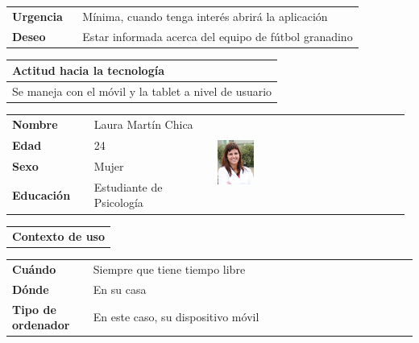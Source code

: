\documentclass[11pt]{article}
\begin{document}
\begin{table}[H]
  \begin{tabular}{p{0.2\linewidth}|p{0.8\linewidth}}
    \toprule
    \textbf{Urgencia} & Mínima, cuando tenga interés abrirá la aplicación\\
    \textbf{Deseo}  & Estar informada acerca del equipo de fútbol granadino \\
    \bottomrule
  \end{tabular}

  \begin{tabular}{p{1.028\linewidth}}
    \textbf{Actitud hacia la tecnología}\\
    \midrule
    Se maneja con el móvil y la tablet a nivel de usuario
  \end{tabular}
\end{table}

\begin{table}[H]
  \centering
  \begin{tabular}{p{0.2\linewidth}|p{0.3\linewidth}p{0.475\linewidth}}
    \toprule
    \textbf{Nombre} & Laura Martín Chica  &\multirow{4}{*}{\begin{minipage}{1.\textwidth}\includegraphics[width=0.2\textwidth, height=30mm]{Ana}\end{minipage}}\\
    \textbf{Edad} & 24 & \\
    \textbf{Sexo} & Mujer & \\
    \textbf{Educación} & Estudiante de Psicología & \\
    \bottomrule
  \end{tabular}

  \begin{tabular}{l}
    \textbf{Contexto de uso} 
  \end{tabular}
  
  \begin{tabular}{p{0.2\linewidth}|p{0.8\linewidth}}
    \toprule
    \textbf{Cuándo} & Siempre que tiene tiempo libre\\
    \textbf{Dónde}  & En su casa\\
    \textbf{Tipo de ordenador} & En este caso, su dispositivo móvil\\
    \bottomrule
  \end{tabular}


\end{table}
\end{document}
